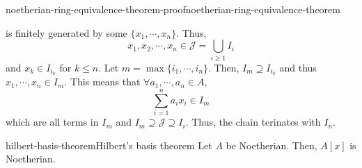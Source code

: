 \documentclass[preview]{standalone}
\begin{document}
\begin{snippetproof}{noetherian-ring-equivalence-theorem-proof}{noetherian-ring-equivalence-theorem}{}
\begin{enumerate}
\begin{enumerate}
            is finitely generated by some \(\{x_1, \cdots, x_n\}\).
            Thus, \[x_1, x_2, \cdots, x_n \in \mathcal{J} = \bigcup_{i\geq 1} I_i\]
            and \(x_k \in I_{i_k}\) for \(k \leq n\).
            Let \(m = \max\{i_1, \cdots, i_n\}\).
            Then, \(I_m \supseteq I_{i_k}\)
            and thus \(x_1, \cdots, x_n \in I_m\).
            This means that \(\forall a_1, \cdots, a_n \in A\),
            \[
                \sum_{i=1}^n a_ix_i \in I_m
            \]
            which are all terms in \(I_m\) and \(I_m \supseteq \mathcal{J} \supseteq I_i\).
            Thus, the chain terinates with \(I_n\).
        \end{enumerate}
    \end{enumerate}
\end{snippetproof}

\begin{snippettheorem}{hilbert-basis-theorem}{Hilbert's basis theorem}
    Let \(A\) be Noetherian. Then, \(A[x]\) is Noetherian.
\end{snippettheorem}
\end{document}
